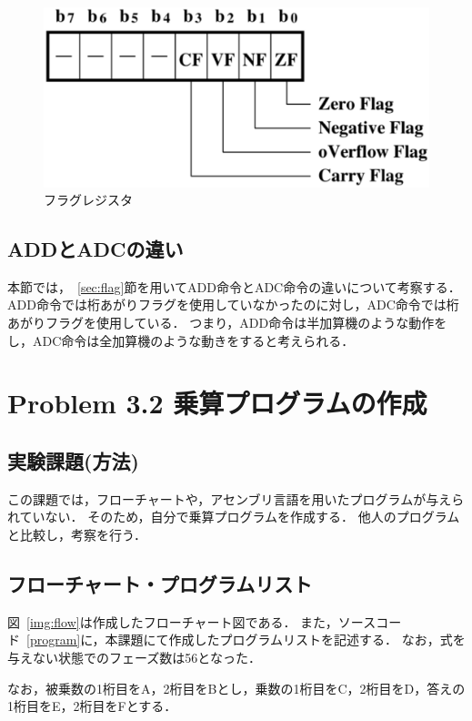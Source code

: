 \documentclass[dvipdfmx]{jsarticle}
\begin{document}
\begin{figure}[htbp]
    \begin{center}
    \includegraphics[scale=0.4]{img/flag.eps}%
    \end{center}
    \vspace{-8mm}
    \caption{フラグレジスタ}
    \label{img:flag}
\end{figure}

\subsection{ADDとADCの違い}
本節では，~\ref{sec:flag}節を用いてADD命令とADC命令の違いについて考察する．
ADD命令では桁あがりフラグを使用していなかったのに対し，ADC命令では桁あがりフラグを使用している．
つまり，ADD命令は半加算機のような動作をし，ADC命令は全加算機のような動きをすると考えられる．

\section{Problem 3.2 乗算プログラムの作成 }
\subsection{実験課題(方法)}
この課題では，フローチャートや，アセンブリ言語を用いたプログラムが与えられていない．
そのため，自分で乗算プログラムを作成する．
他人のプログラムと比較し，考察を行う．
\subsection{フローチャート・プログラムリスト}
図~\ref{img:flow}は作成したフローチャート図である．
また，ソースコード~\ref{program}に，本課題にて作成したプログラムリストを記述する．
なお，式を与えない状態でのフェーズ数は56となった．

なお，被乗数の1桁目をA，2桁目をBとし，乗数の1桁目をC，2桁目をD，答えの1桁目をE，2桁目をFとする．
\end{document}
